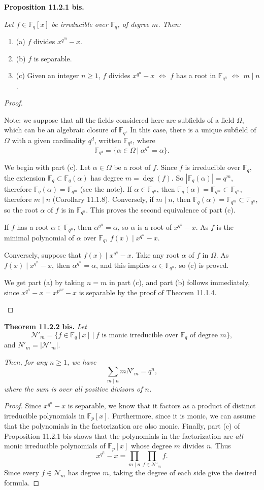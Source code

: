 \documentclass[11pt,a4paper]{article}
\newcommand{\be} {\begin{enumerate}}
\newcommand{\ee} {\end{enumerate}}
\newcommand{\F}{\mathbb{F}}
\begin{document}
{\bf Proposition 11.2.1 bis.}
{\it
Let $f \in \F_q[x]$ be irreducible over $\F_q$, of degree $m$. Then:
\be
\item[(a)] $f$ divides $x^{q^m}-x$.
\item[(b)] $f$ is separable.
\item[(c)] Given an integer $n\geq 1$, $f$ divides $x^{q^n} -x$ $\iff$ $f$ has a root in $\F_{q^n}$ $\iff$ $m\mid n$.
\ee
}
\begin{proof}
\be
Note: we suppose that all the fields considered here are subfields of a field $\Omega$, which can be an algebraic closure of $\F_q$. In this case, there is a unique subfield of $\Omega$ with a given cardinality $q^d$, written $\F_{q^d}$, where
$$\F_{q^d} = \{\alpha \in \Omega \ | \ \alpha^{q^d} = \alpha\}.$$

We begin with part (c). Let $\alpha \in \Omega$ be a root of $f$. Since $f$ is irreducible over $\F_q$, the extension $\F_q \subset \F_q(\alpha)$ has degree $m = \deg(f)$. So $| \F_q(\alpha)| = q^m$, therefore $\F_q(\alpha) = \F_{q^m}$ (see the note). If $\alpha \in \F_{q^n}$, then $\F_q(\alpha) = \F_{q^m} \subset \F_{q^n}$, therefore $m\mid n$ (Corollary 11.1.8). Conversely, if $m\mid n$, then $\F_q(\alpha) = \F_{q^m} \subset \F_{q^n}$, so the root $\alpha$ of $f$ is in $\F_{q^n}$. This proves the second equivalence of part (c).

If $f$ has a root $\alpha \in \F_{q^n}$, then $\alpha^{q^n} = \alpha$, so $\alpha$ is a root of $x^{q^n}-x$. As $f$ is the minimal polynomial of $\alpha$ over $\F_q$, $f(x) \mid x^{q^n}-x$.

Conversely, suppose that $f(x) \mid x^{q^n}-x$. Take any root $\alpha$ of $f$ in $\Omega$. As $f(x) \mid x^{q^n}-x$, then $\alpha^{q^n} = \alpha$, and this implies $\alpha \in \F_{q^n}$, so (c) is proved.

We get part (a) by taking $n=m$ in part (c), and part (b) follows immediately, since $x^{q^n} -x = x^{p^{n \nu }} - x$ is separable by the proof of Theorem 11.1.4.

\ee
\end{proof}

{\bf Theorem 11.2.2 bis.} {\it Let}
$${\mathcal N}'_m =  \{f \in \F_q[x]\ |\  f \text{ is monic irreducible over } \F_q \text{ of degree } m\},$$
and $ N'_m = |{\mathcal N}'_m |$.

{\it Then, for any $n\geq 1$, we have
$$\sum_{m\mid n} m N'_m = q^n,$$
where the sum is over all positive divisors of $n$.}


\begin{proof}
Since $x^{q^n} - x$ is separable, we know that it factors as a product of distinct irreducible polynomials in $\F_p[x]$. Furthermore, since it is monic, we can assume that the polynomials in the factorization are also monic. Finally, part (c) of Proposition 11.2.1 bis shows that the polynomials in the factorization are {\it all} monic irreducible polynomials of $\F_p[x]$ whose degree $m$ divides $n$. Thus
$$x^{q^n} -x = \prod_{m\mid n} \prod_{f \in {\mathcal N}'_m} f.$$
Since every $f\in {\mathcal N}_m$ has degree $m$, taking the degree of each side give the desired formula.
\end{proof}
\bigskip
\end{document}
